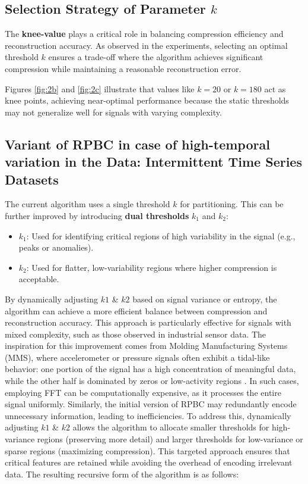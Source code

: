 \documentclass[onecolumn,conference]{IEEEtran}
\begin{document}
\subsection{Selection Strategy of Parameter $k$}
The \textbf{knee-value} plays a critical role in balancing compression efficiency and reconstruction accuracy. As observed in the experiments, selecting an optimal threshold \( k \) ensures a trade-off where the algorithm achieves significant compression while maintaining a reasonable reconstruction error. 

Figures \ref{fig:2b} and \ref{fig:2c} illustrate that values like \( k = 20 \) or \( k = 180 \) act as knee points, achieving near-optimal performance because the static thresholds may not generalize well for signals with varying complexity.

\subsection{Variant of RPBC in case of high-temporal variation in the Data: Intermittent Time Series Datasets}
The current algorithm uses a single threshold \( k \) for partitioning. This can be further improved by introducing \textbf{dual thresholds} \( k_1 \) and \( k_2 \):
\begin{itemize}
    \item \( k_1 \): Used for identifying critical regions of high variability in the signal (e.g., peaks or anomalies).
    \item \( k_2 \): Used for flatter, low-variability regions where higher compression is acceptable.
\end{itemize}
By dynamically adjusting $k1$ \& $k2$ based on signal variance or entropy, the algorithm can achieve a more efficient balance between compression and reconstruction accuracy. This approach is particularly effective for signals with mixed complexity, such as those observed in industrial sensor data. The inspiration for this improvement comes from Molding Manufacturing Systems (MMS), where accelerometer or pressure signals often exhibit a tidal-like behavior: one portion of the signal has a high concentration of meaningful data, while the other half is dominated by zeros or low-activity regions \cite{s22166165}. In such cases, employing FFT can be computationally expensive, as it processes the entire signal uniformly. Similarly, the initial version of RPBC may redundantly encode unnecessary information, leading to inefficiencies. To address this, dynamically adjusting $k1$ \& $k2$ allows the algorithm to allocate smaller thresholds for high-variance regions (preserving more detail) and larger thresholds for low-variance or sparse regions (maximizing compression). This targeted approach ensures that critical features are retained while avoiding the overhead of encoding irrelevant data. The resulting recursive form of the algorithm is as follows:
\end{document}
